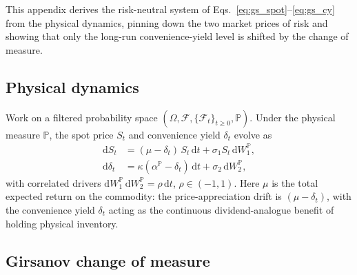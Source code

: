 \documentclass[sigconf, authorversion=true, nonacm=true]{acmart}
\newcommand{\convyield}{\delta}             %
\newcommand{\meanrev}{\kappa}               %
\newcommand{\longrun}{\alpha}               %
\begin{document}
This appendix derives the risk-neutral system of Eqs.~\ref{eq:gs_spot}--\ref{eq:gs_cy} from the physical dynamics, pinning down the two market prices of risk and showing that only the long-run convenience-yield level is shifted by the change of measure.

\subsection{Physical dynamics}

Work on a filtered probability space $(\Omega, \mathcal{F}, \{\mathcal{F}_t\}_{t\geq 0}, \mathbb{P})$. Under the physical measure $\mathbb{P}$, the spot price $S_t$ and convenience yield $\convyield_t$ evolve as
\begin{align}
  \label{eq:app_spot_P}
  \mathrm{d}S_t &= (\mu - \convyield_t)\,S_t\,\mathrm{d}t + \sigma_1 S_t\,\mathrm{d}W_1^{\mathbb{P}}, \\
  \label{eq:app_cy_P}
  \mathrm{d}\convyield_t &= \meanrev(\longrun^{\mathbb{P}} - \convyield_t)\,\mathrm{d}t + \sigma_2\,\mathrm{d}W_2^{\mathbb{P}},
\end{align}
\noindent
with correlated drivers $\mathrm{d}W_1^{\mathbb{P}}\,\mathrm{d}W_2^{\mathbb{P}} = \rho\,\mathrm{d}t$, $\rho \in (-1, 1)$. Here $\mu$ is the total expected return on the commodity: the price-appreciation drift is $(\mu - \convyield_t)$, with the convenience yield $\convyield_t$ acting as the continuous dividend-analogue benefit of holding physical inventory.

\subsection{Girsanov change of measure}
\end{document}
